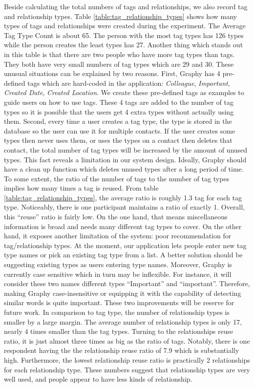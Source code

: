 Beside calculating the total numbers of tags and relationships, we also record tag and relationship types. Table \ref{table:tag_relationship_types} shows how many types of tags and relationships were created during the experiment. The Average Tag Type Count is about 65. The person with the most tag types has 126 types while the person creates the least types has 27. Another thing which stands out in this table is that there are two people who have more tag types than tags. They both have very small numbers of tag types which are 29 and 30. These unusual situations can be explained by two reasons. First, Graphy has 4 pre-defined tags which are hard-coded in the application: \textit{Colleague}, \textit{Important}, \textit{Created Date}, \textit{Created Location}. We create these pre-defined tags as examples to guide users on how to use tags. These 4 tags are added to the number of tag types so it is possible that the users get 4 extra types without actually using them. Second, every time a user creates a tag type, the type is stored in the database so the user can use it for multiple contacts. If the user creates some types then never uses them, or uses the types on a contact then deletes that contact, the total number of tag types will be increased by the amount of unused types. This fact reveals a limitation in our system design. Ideally, Graphy should have a clean up function which deletes unused types after a long period of time. To some extent, the ratio of the number of tags to the number of tag types implies how many times a tag is reused. From table \ref{table:tag_relationship_types}, the average ratio is roughly 1.3 tag for each tag type. Noticeably, there is one participant maintains a ratio of exactly 1. Overall, this ``reuse'' ratio is fairly low. On the one hand, that means miscellaneous information is broad and needs many different tag types to cover. On the other hand, it exposes another limitation of the system: poor recommendation for tag/relationship types. At the moment, our application lets people enter new tag type names or pick an existing tag type from a list. A better solution should be suggesting existing types as users entering type names. Moreover, Graphy is currently case sensitive which in turn may be inflexible. For instance, it will consider these two names different types ``Important'' and ``important''. Therefore, making Graphy case-insensitive or equipping it with the capability of detecting similar words is quite important. These two improvements will be reserve for future work. In comparison to tag type, the number of relationship types is smaller by a large margin. The average number of relationship types is only 17, nearly 4 times smaller than the tag types. Turning to the relationships reuse ratio, it is just almost three times as big as the ratio of tags. Notably, there is one respondent having the the relationship reuse ratio of 7.9 which is substantially high. Furthermore, the lowest relationship reuse ratio is practically 2 relationships for each relationship type. These numbers suggest that relationship types are very well used, and people appear to have less kinds of relationship.

